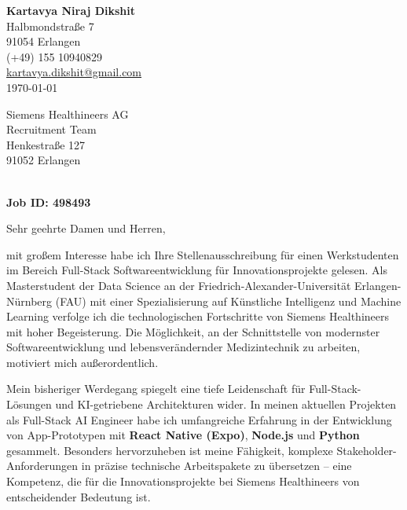 \documentclass[10pt, a4paper]{article}
\begin{document}
\begin{flushright}
    \textbf{Kartavya Niraj Dikshit} \\
    Halbmondstraße 7 \\
    91054 Erlangen \\
    (+49) 155 10940829 \\
    \href{mailto:kartavya.dikshit@gmail.com}{kartavya.dikshit@gmail.com} \\
    \vspace{10pt}
    \today
\end{flushright}

\begin{flushleft}
    Siemens Healthineers AG \\
    Recruitment Team \\
    Henkestraße 127 \\
    91052 Erlangen
\end{flushleft}

\vspace{20pt}

 \\
\noindent \textbf{Job ID: 498493}

\vspace{15pt}

\noindent Sehr geehrte Damen und Herren,

\vspace{10pt}

mit großem Interesse habe ich Ihre Stellenausschreibung für einen Werkstudenten im Bereich Full-Stack Softwareentwicklung für Innovationsprojekte gelesen. Als Masterstudent der Data Science an der Friedrich-Alexander-Universität Erlangen-Nürnberg (FAU) mit einer Spezialisierung auf Künstliche Intelligenz und Machine Learning verfolge ich die technologischen Fortschritte von Siemens Healthineers mit hoher Begeisterung. Die Möglichkeit, an der Schnittstelle von modernster Softwareentwicklung und lebensverändernder Medizintechnik zu arbeiten, motiviert mich außerordentlich.

Mein bisheriger Werdegang spiegelt eine tiefe Leidenschaft für Full-Stack-Lösungen und KI-getriebene Architekturen wider. In meinen aktuellen Projekten als Full-Stack AI Engineer habe ich umfangreiche Erfahrung in der Entwicklung von App-Prototypen mit \textbf{React Native (Expo)}, \textbf{Node.js} und \textbf{Python} gesammelt. Besonders hervorzuheben ist meine Fähigkeit, komplexe Stakeholder-Anforderungen in präzise technische Arbeitspakete zu übersetzen – eine Kompetenz, die für die Innovationsprojekte bei Siemens Healthineers von entscheidender Bedeutung ist.
\end{document}
